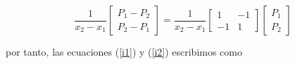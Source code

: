 \documentclass[10pt,a4paper]{article}
\begin{document}
\begin{equation*}
 \frac{1}{x_2-x_1}\left[\begin{array}{c}
                              P_1 - P_2 \\
                              P_2 - P_1 
                        \end{array} \right] = \frac{1}{x_2-x_1}\left[\begin{array}{cc}
                                                                            1 & -1 \\
                                                                            -1 & 1 
                                                                     \end{array} \right]
                                                                     \left[\begin{array}{c}
                                                                                 P_1 \\
                                                                                 P_2 
                                                                           \end{array} \right]
\end{equation*}

por tanto, las ecuaciones (\ref{i1}) y (\ref{i2}) escribimos como
\end{document}
